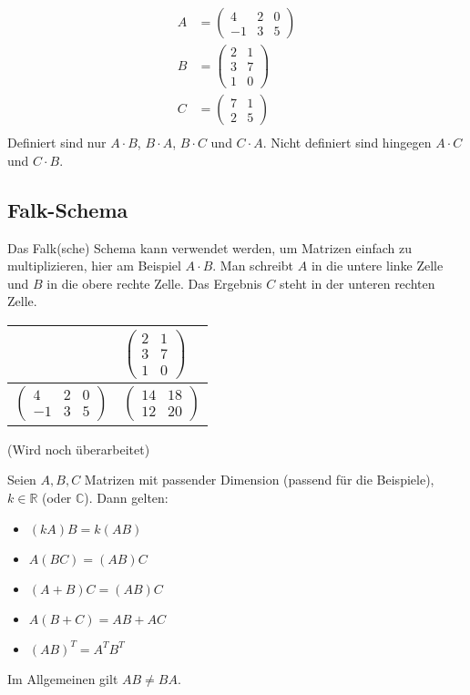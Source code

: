 \begin{align*}
    A &= \begin{pmatrix}
        4 & 2 & 0 \\
        -1 & 3 & 5
    \end{pmatrix} \\
    B &= \begin{pmatrix}
        2 & 1 \\
        3 & 7 \\
        1 & 0
    \end{pmatrix} \\
    C &= \begin{pmatrix}
        7 & 1 \\
        2 & 5
    \end{pmatrix} \\
\end{align*}
Definiert sind nur $A\cdot B$, $B\cdot A$, $B\cdot C$ und $C\cdot A$. Nicht definiert sind hingegen $A\cdot C$ und $C\cdot B$.

\subsection{Falk-Schema}
Das Falk(sche) Schema kann verwendet werden, um Matrizen einfach zu multiplizieren, hier am Beispiel $A\cdot B$. Man schreibt $A$ in die untere linke Zelle und $B$ in die obere rechte Zelle. Das Ergebnis $C$ steht in der unteren rechten Zelle.
\begin{center}
\begin{tabular}{r|l}
    & $\begin{pmatrix}2 & 1\\3 & 7\\1 & 0\end{pmatrix}$ \\ \hline
    $\begin{pmatrix}4 & 2 & 0\\-1 & 3 & 5\end{pmatrix}$ & $\begin{pmatrix} 14 & 18 \\ 12 & 20 \end{pmatrix}$
\end{tabular}
\end{center}
(Wird noch überarbeitet)

Seien $A, B, C$ Matrizen mit passender Dimension (passend für die Beispiele), $k \in \mathbb{R}$ (oder $\mathbb{C}$). Dann gelten:
\begin{itemize}
    \item{$(kA)B = k(AB)$}
    \item{$A(BC) = (AB)C$}
    \item{$(A+B)C = (AB)C$}
    \item{$A(B+C) = AB+AC$}
    \item{$(AB)^T = A^TB^T$}
\end{itemize}
Im Allgemeinen gilt $AB \neq BA$.

